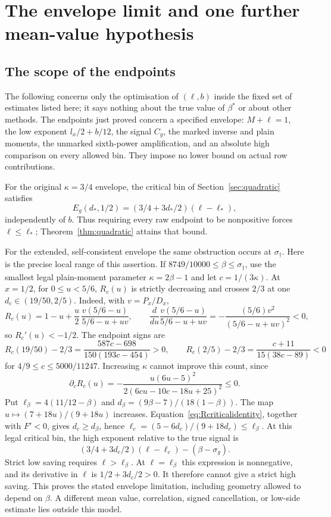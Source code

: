 \section{The envelope limit and one further mean-value hypothesis}\label{sec:limits}
\subsection{The scope of the endpoints}
The following concerns only the optimisation of $(\ell,b)$ inside the fixed set of estimates listed here; it says nothing about the true value of $\beta^*$ or about other methods. The endpoints just proved concern a specified envelope: $M+\ell=1$, the low exponent $l_x/2+b/12$, the signal $C_g$, the marked inverse and plain moments, the unmarked sixth-power amplification, and an absolute high comparison on every allowed bin. They impose no lower bound on actual row contributions.

For the original $\kappa=3/4$ envelope, the critical bin of Section~\ref{sec:quadratic} satisfies
\[
 E_g(d_*,1/2)=(3/4+3d_*/2)(\ell-\ell_*),
\]
independently of $b$. Thus requiring every raw endpoint to be nonpositive forces $\ell\le\ell_*$; Theorem~\ref{thm:quadratic} attains that bound.

For the extended, self-consistent envelope the same obstruction occurs at $\sigma_\dagger$. Here is the precise local range of this assertion. If $8749/10000\le\beta\le\sigma_\dagger$, use the smallest legal plain-moment parameter $\kappa=2\beta-1$ and let $c=1/(3\kappa)$. At $x=1/2$, for $0\le u<5/6$, $R_c(u)$ is strictly decreasing and crosses $2/3$ at one $d_c\in(19/50,2/5)$. Indeed, with $v=P_x/D_x$,
\[
 R_c(u)=1-u+\frac u2\,\frac{v(5/6-u)}{5/6-u+uv},\qquad
 \frac d{du}\frac{v(5/6-u)}{5/6-u+uv}
 =-\frac{(5/6)v^2}{(5/6-u+uv)^2}<0,
\]
so $R_c'(u)<-1/2$. The endpoint signs are
\[
 R_c(19/50)-2/3=\frac{587c-698}{150(193c-454)}>0,\qquad
 R_c(2/5)-2/3=\frac{c+11}{15(38c-89)}<0
\]
for $4/9\le c\le5000/11247$. Increasing $\kappa$ cannot improve this count, since
\[
 \partial_cR_c(u)=-\frac{u(6u-5)^2}{2(6cu-10c-18u+25)^2}\le0.
\]
Put $\ell_\beta=4(11/12-\beta)$ and $d_\beta=(9\beta-7)/(18(1-\beta))$. The map $u\mapsto(7+18u)/(9+18u)$ increases. Equation~\eqref{eq:Rcriticalidentity}, together with $F'<0$, gives $d_c\ge d_\beta$, hence $\ell_c=(5-6d_c)/(9+18d_c)\le\ell_\beta$. At this legal critical bin, the high exponent relative to the true signal is
\[
 (3/4+3d_c/2)(\ell-\ell_c)-(\beta-\sigma_g).
\]
Strict low saving requires $\ell>\ell_\beta$. At $\ell=\ell_\beta$ this expression is nonnegative, and its derivative in $\ell$ is $1/2+3d_c/2>0$. It therefore cannot give a strict high saving. This proves the stated envelope limitation, including geometry allowed to depend on $\beta$. A different mean value, correlation, signed cancellation, or low-side estimate lies outside this model.

